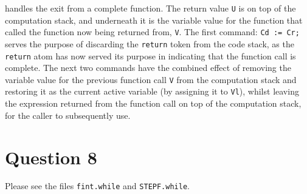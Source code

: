 \documentclass{article}
\begin{document}
handles the exit from a complete function. The return value \texttt{U} is on top of the computation stack, and underneath it is the variable value for the function that called the function now being returned from, \texttt{V}. The first command: \texttt{Cd := Cr;} serves the purpose of discarding the \texttt{return} token from the code stack, as the \texttt{return} atom has now served its purpose in indicating that the function call is complete. The next two commands have the combined effect of removing the variable value for the previous function call \texttt{V} from the computation stack and restoring it as the current active variable (by assigning it to \texttt{Vl}), whilst leaving the expression returned from the function call on top of the computation stack, for the caller to subsequently use.

\section*{Question 8}
Please see the files \texttt{fint.while} and \texttt{STEPF.while}.
\end{document}
